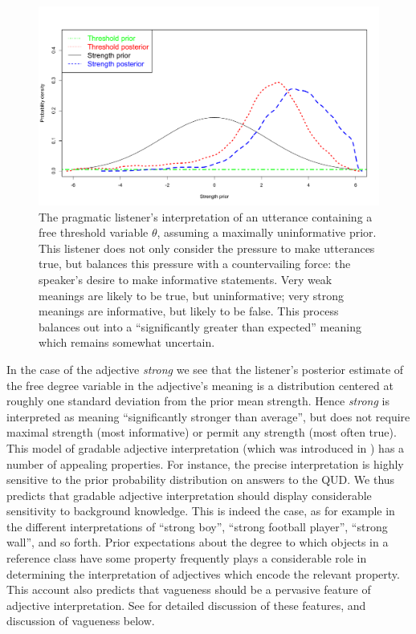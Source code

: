 \documentclass[pdfextras]{handbook}
\begin{document}
\begin{figure}[tbh]
\begin{center}
\includegraphics[scale=.38]{L1-strong-interp.pdf}
\end{center}
\label{L1-adjective-interp}
\caption{The pragmatic listener's interpretation of an utterance containing a free threshold variable $\theta$, assuming a maximally uninformative prior. 
This listener does not only consider the pressure to make utterances true, but balances this pressure with a countervailing force: the speaker's desire to make informative statements. 
Very weak meanings are likely to be true, but uninformative; very strong meanings are informative, but likely to be false. 
This process balances out into a ``significantly greater than expected'' meaning which remains somewhat uncertain.}
\end{figure} 

In the case of the adjective \emph{strong} we see that the listener's posterior estimate of the free degree variable in the adjective's meaning is a distribution centered at roughly one standard deviation from the prior mean strength.
Hence \emph{strong} is interpreted as meaning ``significantly stronger than average'', but does not require maximal strength (most informative) or permit any strength (most often true). 
This model of gradable adjective interpretation (which was introduced in \cite{lassitergoodman13}) has a number of appealing properties. 
For instance, the precise interpretation is highly sensitive to the prior probability distribution on answers to the QUD. 
We thus predicts that gradable adjective interpretation should display considerable sensitivity to background knowledge. 
This is indeed the case, as for example in the different interpretations of ``strong boy'', ``strong football player'', ``strong wall'', and so forth. 
Prior expectations about the degree to which objects in a reference class have some property frequently plays a considerable role in determining the interpretation of adjectives which encode the relevant property. 
This account also predicts that vagueness should be a pervasive feature of adjective interpretation. 
See \cite{lassitergoodman13} for detailed discussion of these features, and discussion of vagueness below. 
\end{document}
